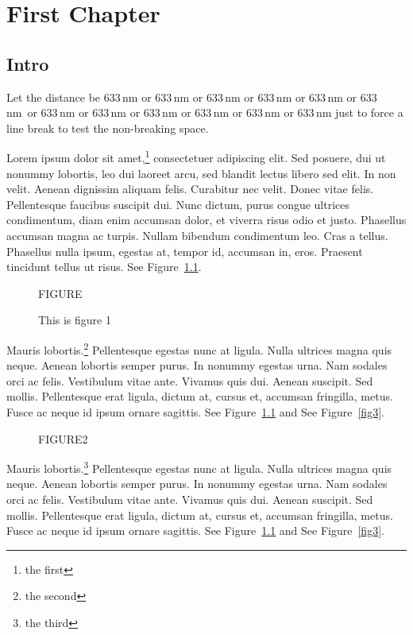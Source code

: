 \documentclass{report}
\begin{document}
\tableofcontents
\listoffigures
\chapter{First Chapter}

\section{Intro}

Let the distance be 633\,nm or 633\,nm or 633\,nm or 633\,nm or 633\,nm or 633\,nm\ or 633\,nm or 633\,nm or 633\,nm or 633\,nm or 633\,nm or 633\,nm just to force a line break to test the non-breaking space.

Lorem ipsum dolor sit amet,\footnote{the first} consectetuer adipiscing elit. Sed posuere, dui ut
nonummy lobortis, leo dui laoreet arcu, sed blandit lectus libero sed elit. In
non velit. Aenean dignissim aliquam felis. Curabitur nec velit. Donec vitae
felis. Pellentesque faucibus suscipit dui. Nunc dictum, purus congue ultrices
condimentum, diam enim accumsan dolor, et viverra risus odio et justo. Phasellus
accumsan magna ac turpis. Nullam bibendum condimentum leo. Cras a tellus.
Phasellus nulla ipsum, egestas at, tempor id, accumsan in, eros. Praesent
tincidunt tellus ut risus.  See Figure~\ref{fig1}.

\begin{figure}[h]
\begin{center}
{\Large FIGURE}
\label{fig1}
\caption{This is figure 1}
\end{center}
\end{figure}

Mauris lobortis.\footnote{the second} Pellentesque egestas nunc at ligula. Nulla ultrices magna quis
neque. Aenean lobortis semper purus. In nonummy egestas urna. Nam sodales orci
ac felis. Vestibulum vitae ante. Vivamus quis dui. Aenean suscipit. Sed mollis.
Pellentesque erat ligula, dictum at, cursus et, accumsan fringilla, metus. Fusce
ac neque id ipsum ornare sagittis.  See Figure~\ref{fig1} and See Figure~\ref{fig3}.

\begin{figure}[ht]
\centering
{\Large FIGURE2}
\end{figure}

Mauris lobortis.\footnote{the third} Pellentesque egestas nunc at ligula. Nulla ultrices magna quis
neque. Aenean lobortis semper purus. In nonummy egestas urna. Nam sodales orci
ac felis. Vestibulum vitae ante. Vivamus quis dui. Aenean suscipit. Sed mollis.
Pellentesque erat ligula, dictum at, cursus et, accumsan fringilla, metus. Fusce
ac neque id ipsum ornare sagittis.  See Figure~\ref{fig1} and See Figure~\ref{fig3}.
\end{document}
